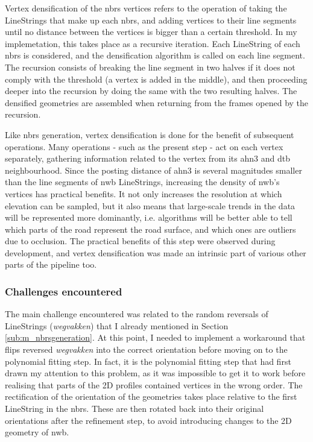 Vertex densification of the \ac{nbrs} vertices refers to the operation of taking the LineStrings that make up each \ac{nbrs}, and adding vertices to their line segments until no distance between the vertices is bigger than a certain threshold. In my implemetation, this takes place as a recursive iteration. Each LineString of each \ac{nbrs} is considered, and the densification algorithm is called on each line segment. The recursion consists of breaking the line segment in two halves if it does not comply with the threshold (a vertex is added in the middle), and then proceeding deeper into the recursion by doing the same with the two resulting halves. The densified geometries are assembled when returning from the frames opened by the recursion.

Like \ac{nbrs} generation, vertex densification is done for the benefit of subsequent operations. Many operations - such as the present step - act on each vertex separately, gathering information related to the vertex from its \ac{ahn3} and \ac{dtb} neighbourhood. Since the posting distance of \ac{ahn3} is several magnitudes smaller than the line segments of \ac{nwb} LineStrings, increasing the density of \ac{nwb}'s vertices has practical benefits. It not only increases the resolution at which elevation can be sampled, but it also means that large-scale trends in the data will be represented more dominantly, i.e. algorithms will be better able to tell which parts of the road represent the road surface, and which ones are outliers due to occlusion. The practical benefits of this step were observed during development, and vertex densification was made an intrinsic part of various other parts of the pipeline too.

\subsubsection{Challenges encountered}

The main challenge encountered was related to the random reversals of LineStrings (\textit{wegvakken}) that I already mentioned in Section \ref{sub:m_nbrsgeneration}. At this point, I needed to implement a workaround that flips reversed \textit{wegvakken} into the correct orientation before moving on to the polynomial fitting step. In fact, it is the polynomial fitting step that had first drawn my attention to this problem, as it was impossible to get it to work before realising that parts of the 2D profiles contained vertices in the wrong order. The rectification of the orientation of the geometries takes place relative to the first LineString in the \ac{nbrs}. These are then rotated back into their original orientations after the refinement step, to avoid introducing changes to the 2D geometry of \ac{nwb}.

